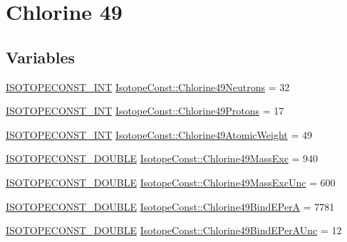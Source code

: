 \hypertarget{group___isotope_const-_chlorine-_cl49}{}\section{Chlorine 49}
\label{group___isotope_const-_chlorine-_cl49}
\subsection*{Variables}
\begin{DoxyCompactItemize}
\item 
\mbox{\hyperlink{group___isotope_const-_macros_ga5f18360b3e99483a35c32d789e62621c}{I\+S\+O\+T\+O\+P\+E\+C\+O\+N\+S\+T\+\_\+\+I\+NT}} \mbox{\hyperlink{group___isotope_const-_chlorine-_cl49_ga7629a0fe90db6deb62b5b41a45530e0e}{Isotope\+Const\+::\+Chlorine49\+Neutrons}} = 32
\item 
\mbox{\hyperlink{group___isotope_const-_macros_ga5f18360b3e99483a35c32d789e62621c}{I\+S\+O\+T\+O\+P\+E\+C\+O\+N\+S\+T\+\_\+\+I\+NT}} \mbox{\hyperlink{group___isotope_const-_chlorine-_cl49_ga52639bbae4e482c1dc7b14a6a44a6d2b}{Isotope\+Const\+::\+Chlorine49\+Protons}} = 17
\item 
\mbox{\hyperlink{group___isotope_const-_macros_ga5f18360b3e99483a35c32d789e62621c}{I\+S\+O\+T\+O\+P\+E\+C\+O\+N\+S\+T\+\_\+\+I\+NT}} \mbox{\hyperlink{group___isotope_const-_chlorine-_cl49_gab1a0263f19a7c66dfaaecab0cc2be850}{Isotope\+Const\+::\+Chlorine49\+Atomic\+Weight}} = 49
\item 
\mbox{\hyperlink{group___isotope_const-_macros_ga8f45a7272ce02c0b4c65c44636ed719a}{I\+S\+O\+T\+O\+P\+E\+C\+O\+N\+S\+T\+\_\+\+D\+O\+U\+B\+LE}} \mbox{\hyperlink{group___isotope_const-_chlorine-_cl49_gaafec15529a6d3d3f52e40ee333452b6d}{Isotope\+Const\+::\+Chlorine49\+Mass\+Exc}} = 940
\item 
\mbox{\hyperlink{group___isotope_const-_macros_ga8f45a7272ce02c0b4c65c44636ed719a}{I\+S\+O\+T\+O\+P\+E\+C\+O\+N\+S\+T\+\_\+\+D\+O\+U\+B\+LE}} \mbox{\hyperlink{group___isotope_const-_chlorine-_cl49_ga9d649f8366db8e4eb06d600f24e33ec2}{Isotope\+Const\+::\+Chlorine49\+Mass\+Exc\+Unc}} = 600
\item 
\mbox{\hyperlink{group___isotope_const-_macros_ga8f45a7272ce02c0b4c65c44636ed719a}{I\+S\+O\+T\+O\+P\+E\+C\+O\+N\+S\+T\+\_\+\+D\+O\+U\+B\+LE}} \mbox{\hyperlink{group___isotope_const-_chlorine-_cl49_ga36058f3b27d633e209a56fa6ba61e3e0}{Isotope\+Const\+::\+Chlorine49\+Bind\+E\+PerA}} = 7781
\item 
\mbox{\hyperlink{group___isotope_const-_macros_ga8f45a7272ce02c0b4c65c44636ed719a}{I\+S\+O\+T\+O\+P\+E\+C\+O\+N\+S\+T\+\_\+\+D\+O\+U\+B\+LE}} \mbox{\hyperlink{group___isotope_const-_chlorine-_cl49_ga5be058f0688c3bbf8b18e4399a10ae54}{Isotope\+Const\+::\+Chlorine49\+Bind\+E\+Per\+A\+Unc}} = 12

\end{DoxyCompactItemize}
